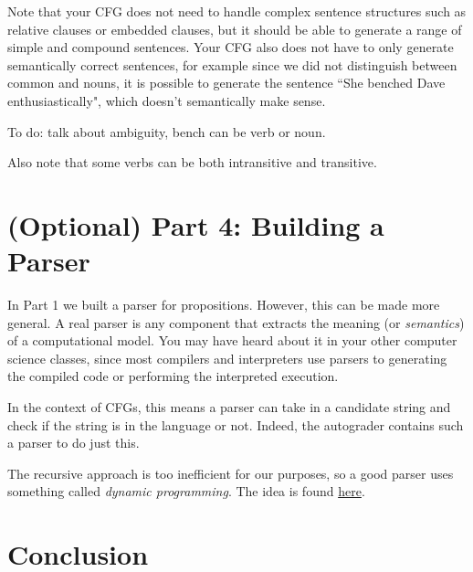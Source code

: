 \documentclass{article}
\begin{document}
\begin{tcolorbox}[enhanced,interior style={top color=Dandelion!20,bottom color=Dandelion!30}]
\begin{itemize}
            Note that your CFG does not need to handle complex sentence structures such as relative clauses or embedded clauses, but it should be able to generate a range of simple and compound sentences. Your CFG also does not have to only generate semantically correct sentences, for example since we did not distinguish between common and nouns, it is possible to generate the sentence ``She benched Dave enthusiastically", which doesn't semantically make sense.

            To do: talk about ambiguity, bench can be verb or noun.

            Also note that some verbs can be both intransitive and transitive.
    \end{itemize}
\end{tcolorbox}


\section*{(Optional) Part 4: Building a Parser}
    In Part 1 we built a parser for propositions. However, this can be made more general. A real parser is any component that extracts the meaning (or \textit{semantics}) of a computational model. You may have heard about it in your other computer science classes, since most compilers and interpreters use parsers to generating the compiled code or performing the interpreted execution.

    \vspace{2mm} In the context of CFGs, this means a parser can take in a candidate string and check if the string is in the language or not. Indeed, the autograder contains such a parser to do just this.

    The recursive approach is too inefficient for our purposes, so a good parser uses something called \textit{dynamic programming}. The idea is found \href{https://courses.cs.washington.edu/courses/cse401/16wi/lectures/10-CYK-Earley-Disambig-wi16.pdf}{here}.


\section*{Conclusion}
\end{document}
